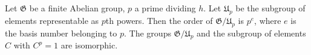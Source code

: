 Let $\mathfrak{G}$ be a finite Abelian group, $p$ a prime dividing $h$. Let $\mathfrak{U}_p$ be the subgroup of elements representable as $p$th powers. Then the order of $\mathfrak{G}/\mathfrak{U}_p$ is $p^e$, where $e$ is the basis number belonging to $p$. The groups $\mathfrak{G}/\mathfrak{U}_p$ and the subgroup of elements $C$ with $C^p = 1$ are isomorphic.
